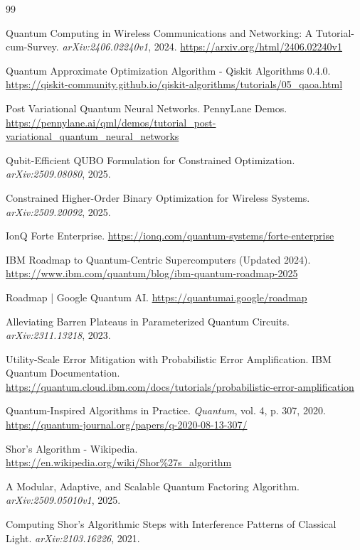 \documentclass[11pt,a4paper]{article}
\begin{document}
\begin{thebibliography}{99}
\sloppy %

Quantum Computing in Wireless Communications and Networking: A Tutorial-cum-Survey.
\textit{arXiv:2406.02240v1}, 2024.
\url{https://arxiv.org/html/2406.02240v1}

Quantum Approximate Optimization Algorithm - Qiskit Algorithms 0.4.0.
\url{https://qiskit-community.github.io/qiskit-algorithms/tutorials/05_qaoa.html}

Post Variational Quantum Neural Networks.
PennyLane Demos.
\url{https://pennylane.ai/qml/demos/tutorial_post-variational_quantum_neural_networks}

Qubit-Efficient QUBO Formulation for Constrained Optimization.
\textit{arXiv:2509.08080}, 2025.

Constrained Higher-Order Binary Optimization for Wireless Systems.
\textit{arXiv:2509.20092}, 2025.

IonQ Forte Enterprise.
\url{https://ionq.com/quantum-systems/forte-enterprise}

IBM Roadmap to Quantum-Centric Supercomputers (Updated 2024).
\url{https://www.ibm.com/quantum/blog/ibm-quantum-roadmap-2025}

Roadmap | Google Quantum AI.
\url{https://quantumai.google/roadmap}

Alleviating Barren Plateaus in Parameterized Quantum Circuits.
\textit{arXiv:2311.13218}, 2023.

Utility-Scale Error Mitigation with Probabilistic Error Amplification.
IBM Quantum Documentation.
\url{https://quantum.cloud.ibm.com/docs/tutorials/probabilistic-error-amplification}

Quantum-Inspired Algorithms in Practice.
\textit{Quantum}, vol. 4, p. 307, 2020.
\url{https://quantum-journal.org/papers/q-2020-08-13-307/}

Shor's Algorithm - Wikipedia.
\url{https://en.wikipedia.org/wiki/Shor%27s_algorithm}

A Modular, Adaptive, and Scalable Quantum Factoring Algorithm.
\textit{arXiv:2509.05010v1}, 2025.

Computing Shor's Algorithmic Steps with Interference Patterns of Classical Light.
\textit{arXiv:2103.16226}, 2021.


\end{thebibliography}
\end{document}
